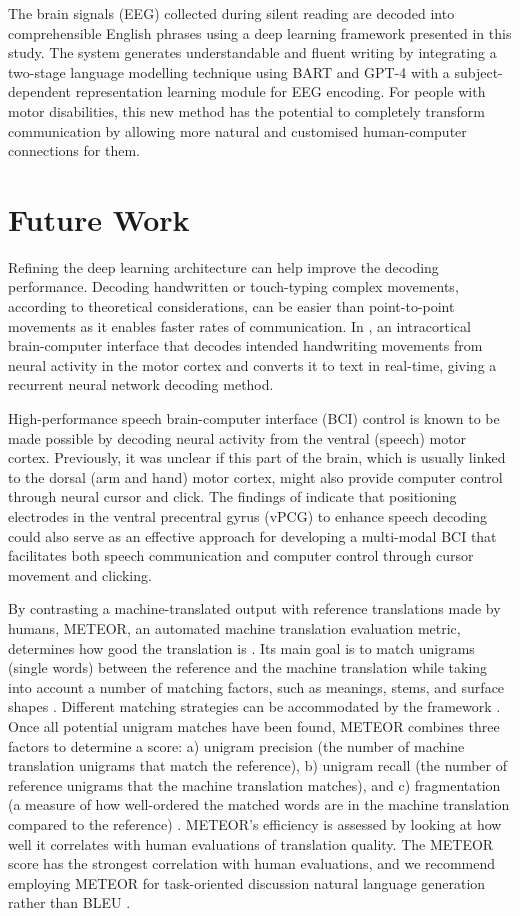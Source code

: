 \documentclass[journal]{IEEEtran}
\begin{document}
    
The brain signals (EEG) collected during silent reading are decoded into comprehensible English phrases using a deep learning framework presented in this study. The system generates understandable and fluent writing by integrating a two-stage language modelling technique using BART and GPT-4 with a subject-dependent representation learning module for EEG encoding. For people with motor disabilities, this new method has the potential to completely transform communication by allowing more natural and customised human-computer connections for them.

\section{Future Work}

Refining the deep learning architecture can help improve the decoding performance. Decoding handwritten or touch-typing complex movements, according to theoretical considerations, can be easier than point-to-point movements as it enables faster rates of communication. In \cite{Willett2021}, an intracortical brain-computer interface that decodes intended handwriting movements from neural activity in the motor cortex and converts it to text in real-time, giving a recurrent neural network decoding method.


High-performance speech brain-computer interface (BCI) control is known to be made possible by decoding neural activity from the ventral (speech) motor cortex. Previously, it was unclear if this part of the brain, which is usually linked to the dorsal (arm and hand) motor cortex, might also provide computer control through neural cursor and click. The findings of \cite{SingerClark2024} indicate that positioning electrodes in the ventral precentral gyrus (vPCG) to enhance speech decoding could also serve as an effective approach for developing a multi-modal BCI that facilitates both speech communication and computer control through cursor movement and clicking.


By contrasting a machine-translated output with reference translations made by humans, METEOR, an automated machine translation evaluation metric, determines how good the translation is \cite{Banerjee2005}. Its main goal is to match unigrams (single words) between the reference and the machine translation while taking into account a number of matching factors, such as meanings, stems, and surface shapes \cite{Banerjee2005}. Different matching strategies can be accommodated by the framework \cite{Banerjee2005}. Once all potential unigram matches have been found, METEOR combines three factors to determine a score: a) unigram precision (the number of machine translation unigrams that match the reference), b) unigram recall (the number of reference unigrams that the machine translation matches), and c) fragmentation (a measure of how well-ordered the matched words are in the machine translation compared to the reference) \cite{Banerjee2005}. METEOR's efficiency is assessed by looking at how well it correlates with human evaluations of translation quality. The METEOR score has the strongest correlation with human evaluations, and we recommend employing METEOR for task-oriented discussion natural language generation rather than BLEU \cite{Banerjee2005}.
\end{document}
